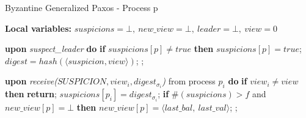 \begin{algorithm} 
	\caption{Byzantine Generalized Paxos - Process p}
	\label{BFT-Proc}
	\textbf{Local variables:} $suspicions = \bot,\ new\_view = \bot,\ leader = \bot,\ view = 0$
	\begin{algorithmic}[1]
		
		\State \textbf{upon} \textit{suspect\_leader} \textbf{do} 
		\State \hspace{\algorithmicindent} \textbf{if} $suspicions[p] \neq true$ \textbf{then}
		\State\hspace{\algorithmicindent}\hspace{\algorithmicindent}$suspicions[p] = true$;
		\State\hspace{\algorithmicindent}\hspace{\algorithmicindent}$ digest = hash(\langle suspicion, view \rangle) $;
		\State\hspace{\algorithmicindent}\hspace{\algorithmicindent};	
		\State
		
		\State \textbf{upon} \textit{receive($SUSPICION, view_i, digest_{\sigma_i}$)} from process $p_i$ \textbf{do} 
		\State \hspace{\algorithmicindent} \textbf{if} $view_i \neq view$ \textbf{then}
		\State \hspace{\algorithmicindent}\hspace{\algorithmicindent} \textbf{return};
		\State
		\State \hspace{\algorithmicindent} $suspicions[p_i] = digest_{\sigma_i}$;
		\State \hspace{\algorithmicindent} \textbf{if} $\#(suspicions) > f$ and $new\_view[p] = \bot$ \textbf{then}
		\State\hspace{\algorithmicindent}\hspace{\algorithmicindent} $new\_view[p] = \langle last\_bal,\ last\_val \rangle$;
		\State\hspace{\algorithmicindent}\hspace{\algorithmicindent}  ;
		\State
		

\end{algorithmic}
\end{algorithm}
